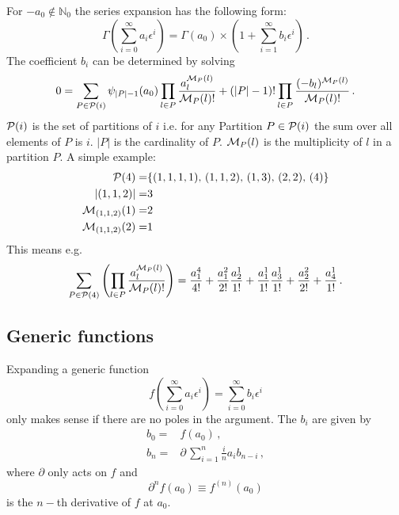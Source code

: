 \documentclass[titlepage]{article}
\begin{document}
For $-a_0 \notin \mathbb{N}_0$ the series expansion has the following
form:
\begin{equation}
  \label{eq:gamma}
  \Gamma\left(\sum_{i=0}^\infty a_i\epsilon^i\right) =
  \Gamma(a_0)\times\left(1+\sum_{i=1}^\infty b_i\epsilon^i\right)\,.
\end{equation}
The coefficient $b_i$ can be determined by solving
\begin{equation}
  \label{eq:gamma_rec}
  0 = \sum_{P \in \mathcal{P}(i)} \psi_{|P|-1}(a_0)\prod_{l\in
    P}\frac{a_l^{{\cal M}_P(l)}}{{\cal M}_P(l)!}
+ (|P|-1)!\*\prod_{l \in P}\frac{(-b_l)^{{\cal M}_P(l)}}{{\cal M}_P(l)!}\,.
\end{equation}
${\cal P}(i)$ is the set of partitions of $i$ i.e. for any
Partition $P \in {\cal P}(i)$ the sum over all elements of $P$ is
$i$. $|P|$ is the cardinality of $P$.
${\cal M}_P(l)$ is the multiplicity of $l$ in a partition $P$. A simple
example:
\begin{align*}
  {\cal P}(4)=&\{(1,1,1,1),\,(1,1,2),\,(1,3),\,(2,2),\,(4)\}\\
  |(1,1,2)|=&3\\
  {\cal M}_{(1,1,2)}(1)=&2\\
  {\cal M}_{(1,1,2)}(2)=&1\\
\end{align*}
This means e.g.
\begin{equation}
  \label{eq:exp_ex}
\sum_{P \in {\cal P}(4)} \left(\prod_{l \in P} \frac{a^{{\cal M}_P(l)}_l}{{\cal M}_P(l)!} \right)=
  \frac{a_1^4}{4!}+\frac{a_1^2}{2!}\frac{a_2^1}{1!}+\frac{a_1^1}{1!}\frac{a_3^1}{1!}+\frac{a_2^2}{2!}+\frac{a_4^1}{1!}\,.
\end{equation}


\subsection{Generic functions}
\label{sec:generic_fun}

Expanding a generic function
\begin{equation}
  \label{eq:generic_fun}
  f\left(\sum_{i=0}^{\infty}a_i
    \epsilon^i\right)=\sum_{i=0}^{\infty}b_i
    \epsilon^i
\end{equation}
only makes sense if there are no poles in the argument.
The $b_i$ are given by
\begin{align}
  \label{eq:generic_rec}
  b_0=&f(a_0)\,,\\
  b_n=&\partial\,\sum_{i=1}^{n}\frac{i}{n} a_{i}b_{n-i} \,,
\end{align}
where $\partial$ only acts on $f$ and
\begin{equation}
  \label{eq:partial}
  \partial^n f(a_0) \equiv f^{(n)}(a_0)
\end{equation}
is the $n-$th derivative of $f$ at $a_0$.
\end{document}
